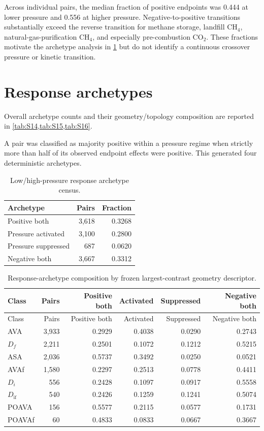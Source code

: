 \documentclass[11pt,a4paper]{article}
\begin{document}
Across individual pairs, the median fraction of positive endpoints was 0.444 at
lower pressure and 0.556 at higher pressure. Negative-to-positive transitions
substantially exceed the reverse transition for methane storage, landfill CH$_4$,
natural-gas-purification CH$_4$, and especially pre-combustion CO$_2$. These
fractions motivate the archetype analysis in \cref{sec:archetypes} but do not
identify a continuous crossover pressure or kinetic transition.

\section{Response archetypes}
\label{sec:archetypes}

Overall archetype counts and their geometry/topology composition are reported in
\cref{tab:S14,tab:S15,tab:S16}.


A pair was classified as majority positive within a pressure regime when strictly
more than half of its observed endpoint effects were positive. This generated four
deterministic archetypes.

\begin{table}[H]
\centering
\caption{Low/high-pressure response archetype census.}
\label{tab:S14}
\begin{tabular}{lrr}
\toprule
Archetype & Pairs & Fraction \\
\midrule
Positive both & 3,618 & 0.3268 \\
Pressure activated & 3,100 & 0.2800 \\
Pressure suppressed & 687 & 0.0620 \\
Negative both & 3,667 & 0.3312 \\
\bottomrule
\end{tabular}
\end{table}

\begingroup
\small
\setlength{\tabcolsep}{3pt}
\begin{longtable}{lrrrrr}
\caption{Response-archetype composition by frozen largest-contrast geometry descriptor.}
\label{tab:S15}\\
\toprule
Class & Pairs & Positive both & Activated & Suppressed & Negative both \\
\midrule
\endfirsthead
\toprule
Class & Pairs & Positive both & Activated & Suppressed & Negative both \\
\midrule
\endhead
AVA & 3,933 & 0.2929 & 0.4038 & 0.0290 & 0.2743 \\
$D_f$ & 2,211 & 0.2501 & 0.1072 & 0.1212 & 0.5215 \\
ASA & 2,036 & 0.5737 & 0.3492 & 0.0250 & 0.0521 \\
AVAf & 1,580 & 0.2297 & 0.2513 & 0.0778 & 0.4411 \\
$D_i$ & 556 & 0.2428 & 0.1097 & 0.0917 & 0.5558 \\
$D_{\mathrm{if}}$ & 540 & 0.2426 & 0.1259 & 0.1241 & 0.5074 \\
POAVA & 156 & 0.5577 & 0.2115 & 0.0577 & 0.1731 \\
POAVAf & 60 & 0.4833 & 0.0833 & 0.0667 & 0.3667 \\
\bottomrule
\end{longtable}
\endgroup
\end{document}
